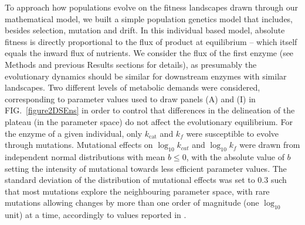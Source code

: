 \documentclass[11pt,onecolumn]{article}
\begin{document}
To approach how populations evolve on the fitness landscapes drawn through our mathematical model, we built a simple population genetics model that includes, besides selection, mutation and drift. In this individual based model, absolute fitness is directly proportional to the flux of product at equilibrium -- which itself equals the inward flux of nutrients. We consider the flux of the first enzyme (see Methods and previous Results sections for details), as presumably the evolutionary dynamics should be similar for downstream enzymes with similar landscapes. Two different levels of metabolic demands were considered, corresponding to parameter values used to draw panels (A) and (I) in FIG.~\ref{figure2DSEns} in order to control that differences in the delineation of the plateau (in the parameter space) do not affect the evolutionary equilibrium. For the enzyme of a given individual, only $k_\text{cat}$ and $k_f$ were susceptible to evolve through mutations. Mutational effects on $\log_{10}k_{cat}$ and $\log_{10}k_f$ were drawn from independent normal distributions with mean $b \leq 0$, with the absolute value of $b$ setting the intensity of mutational towards less efficient parameter values. The standard deviation of the distribution of mutational effects was set to $0.3$ such that most mutations explore the neighbouring parameter space, with rare mutations allowing changes by more than one order of magnitude (one $\log_{10}$ unit) at a time, accordingly to values reported in \citep{Carlin16}. %
\end{document}
